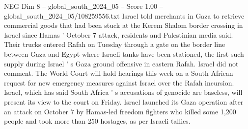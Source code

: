 \begin{textsample}{NEG Dim 8 – global\_south\_2024\_05 – Score 1.00 – global\_south\_2024\_05/108259556.txt}
Israel told merchants in Gaza to retrieve commercial goods that had been stuck at the Kerem Shalom border crossing in Israel since Hamas ' October 7 attack, residents and Palestinian media said.
Their trucks entered Rafah on Tuesday through a gate on the border line between Gaza and Egypt where Israeli tanks have been stationed, the first such supply during Israel ' s Gaza ground offensive in eastern Rafah.
Israel did not comment.
The World Court will hold hearings this week on a South African request for new emergency measures against Israel over the Rafah incursion.
Israel, which has said South Africa ' s accusations of genocide are baseless, will present its view to the court on Friday.
Israel launched its Gaza operation after an attack on October 7 by Hamas-led freedom fighters who killed some 1,200 people and took more than 250 hostages, as per Israeli tallies.

\end{textsample}
